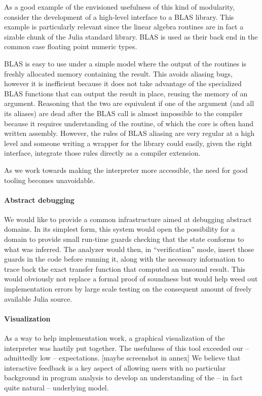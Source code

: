 \documentclass[11pt]{article}
\begin{document}
As a good example of the envisioned usefulness of this kind of modularity, consider the development of a high-level interface to a BLAS library.
This example is particularly relevant since the linear algebra routines are in fact a sizable chunk of the Julia standard library. BLAS is used as their back end in the common case floating point numeric types.

BLAS is easy to use under a simple model where the output of the routines is freshly allocated memory containing the result. This avoids aliasing bugs, however it is inefficient because it does not take advantage of the specialized BLAS functions that can output the result in place, reusing the memory of an argument. Reasoning that the two are equivalent if one of the argument (and all its aliases) are dead after the BLAS call is almost impossible to the compiler because it requires understanding of the routine, of which the core is often hand written assembly.
However, the rules of BLAS aliasing are very regular at a high level and someone writing a wrapper for the library could easily, given the right interface, integrate those rules directly as a compiler extension.

As we work towards making the interpreter more accessible, the need for good tooling becomes unavoidable.

\paragraph{Abstract debugging} We would like to provide a common infrastructure aimed at debugging abstract domains.
In its simplest form, this system would open the possibility for a domain to provide small run-time guards checking that the state conforms to what was inferred.
The analyzer would then, in ``verification'' mode, insert those guards in the code before running it, along with the necessary information to trace back the exact transfer function that computed an unsound result.
This would obviously not replace a formal proof of soundness but would help weed out implementation errors by large scale testing on the consequent amount of freely available Julia source.

\paragraph{Visualization} As a way to help implementation work, a graphical visualization of the interpreter was hastily put together.
The usefulness of this tool exceeded our -- admittedly low -- expectations. [maybe screenshot in annex]
We believe that interactive feedback is a key aspect of allowing users with no particular background in program analysis to develop an understanding of the -- in fact quite natural -- underlying model.
\end{document}
